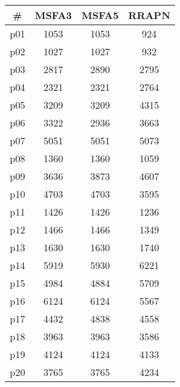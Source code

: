 \begin{tabular}{cccc}
\toprule
\textbf{\#} & \textbf{MSFA3} & \textbf{MSFA5} & \textbf{RRAPN}\\
\midrule
p01 & 1053 & 1053 & 924\\
p02 & 1027 & 1027 & 932\\
p03 & 2817 & 2890 & 2795\\
p04 & 2321 & 2321 & 2764\\
p05 & 3209 & 3209 & 4315\\
p06 & 3322 & 2936 & 3663\\
p07 & 5051 & 5051 & 5073\\
p08 & 1360 & 1360 & 1059\\
p09 & 3636 & 3873 & 4607\\
p10 & 4703 & 4703 & 3595\\
p11 & 1426 & 1426 & 1236\\
p12 & 1466 & 1466 & 1349\\
p13 & 1630 & 1630 & 1740\\
p14 & 5919 & 5930 & 6221\\
p15 & 4984 & 4884 & 5709\\
p16 & 6124 & 6124 & 5567\\
p17 & 4432 & 4838 & 4558\\
p18 & 3963 & 3963 & 3586\\
p19 & 4124 & 4124 & 4133\\
p20 & 3765 & 3765 & 4234\\
\bottomrule
\end{tabular}

